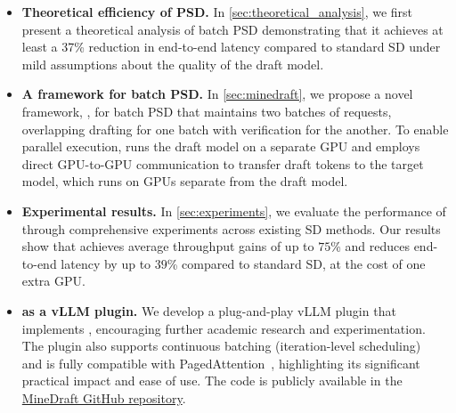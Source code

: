 \vspace{-3mm}
\begin{itemize}[leftmargin=*]
	\setlength\itemsep{-0.1em}
    \setlength{\itemindent}{2pt}
    \item \textbf{Theoretical efficiency of PSD.}
    In \cref{sec:theoretical_analysis}, we first present a theoretical analysis of batch PSD demonstrating that it achieves at least a 37\% reduction in end-to-end latency compared to standard SD under mild assumptions about the quality of the draft model.
       
    \item \textbf{A framework for batch PSD.}
    In \cref{sec:minedraft}, we propose a novel framework, \alg{}, for batch PSD that maintains two batches of requests, overlapping drafting for one batch with verification for the another. To enable parallel execution, \alg{} runs the draft model on a separate GPU and employs direct GPU-to-GPU communication to transfer draft tokens to the target model, which runs on GPUs separate from the draft model.
   
    \item \textbf{Experimental results.}
    In \cref{sec:experiments}, we evaluate the performance of \alg{} through comprehensive experiments across existing SD methods. Our results show that \alg{} achieves average throughput gains of up to $75$\% and reduces end-to-end latency by up to $39$\% compared to standard SD, at the cost of one extra GPU.

    \item \textbf{\alg{} as a vLLM plugin.}
    We develop a plug-and-play vLLM plugin that implements \alg{}, encouraging further academic research and experimentation. The plugin also supports continuous batching (iteration-level scheduling)~\citep{yu2022orca} and is fully compatible with PagedAttention~\citep{kwon2023vllm}, highlighting its significant practical impact and ease of use. The code is publicly available in the \href{https://github.com/electron-shaders/MineDraft}{MineDraft GitHub repository}. 
\end{itemize}
